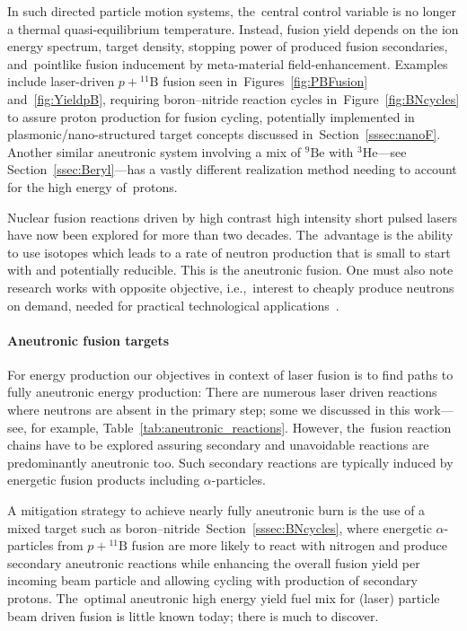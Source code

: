 \documentclass[particles,article,accept,pdftex,moreauthors]{Definitions/mdpi}
\begin{document}
In such directed particle motion systems, the~central control variable is no longer a thermal quasi-equilibrium temperature. Instead, fusion yield depends on the ion energy spectrum, target density, stopping power of produced fusion secondaries, and~pointlike fusion inducement by meta-material field-enhancement. Examples include laser-driven $p+{}^{11}\mathrm{B}$ fusion seen in~Figures~\ref{fig:PBFusion} and~\ref{fig:YieldpB}, requiring boron--nitride reaction cycles in~Figure~\ref{fig:BNcycles} to assure proton production for fusion cycling, potentially implemented in plasmonic/nano-structured target concepts discussed in~Section~\ref{sssec:nanoF}. Another similar aneutronic system involving a mix of ${}^9\mathrm{Be}$ with ${}^{3}\mathrm{He}$---see Section~\ref{ssec:Beryl}---has a vastly different realization method needing to account for the high energy of~protons.

Nuclear fusion reactions driven by high contrast high intensity short pulsed lasers have now been explored for more than two decades. The~advantage is the ability to use isotopes which leads to a rate of neutron production that is small to start with and potentially reducible. This is the aneutronic fusion. One must also note research works with opposite objective, i.e.,~interest to cheaply produce neutrons on demand, needed for practical technological applications~\cite{Karsch2002Neutrons}.


\vspace{-6pt}\paragraph*{\bf Aneutronic fusion targets}
For energy production our objectives in context of laser fusion is to find paths to fully aneutronic energy production: There are numerous laser driven reactions where neutrons are absent in the primary step; some we discussed in this work---see, for example, Table~\ref{tab:aneutronic_reactions}. However, the~fusion reaction chains have to be explored assuring secondary and unavoidable reactions are predominantly aneutronic too. Such secondary reactions are typically induced by energetic fusion products including $\alpha$-particles.

A mitigation strategy to achieve nearly fully aneutronic burn is the use of a mixed target such as boron--nitride~Section~\ref{sssec:BNcycles}, where energetic $\alpha$-particles from $p+{}^{11}\mathrm{B}$ fusion are more likely to react with nitrogen and produce secondary aneutronic reactions while enhancing the overall fusion yield per incoming beam particle and allowing cycling with production of secondary protons. The~optimal aneutronic high energy yield fuel mix for (laser) particle beam driven fusion is little known today; there is much to discover.
\end{document}
